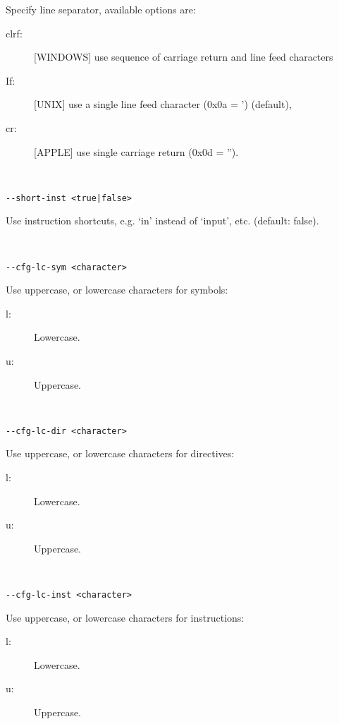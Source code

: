                 Specify line separator, available options are:
                \begin{description}
                  \item [clrf:] [WINDOWS] use sequence of carriage return and line feed characters
                  \item [If:] [UNIX] use a single line feed character (0x0a = ') (default),
                  \item [cr:] [APPLE] use single carriage return (0x0d = '').
                \end{description}
                {
                ~\\
                \usecodefont

                \verb'--short-inst <true|false>'\\
                }
                Use instruction shortcuts, e.g. `in' instead of `input', etc. (default: false).
                {
                ~\\
                \usecodefont

                \verb'--cfg-lc-sym <character>'\\
                }
                Use uppercase, or lowercase characters for symbols:
                \begin{description}
                    \item [l:] Lowercase.
                    \item [u:] Uppercase.
                \end{description}
                {
                ~\\
                \usecodefont

                \verb'--cfg-lc-dir <character>'\\
                }
                Use uppercase, or lowercase characters for directives:
                \begin{description}
                    \item [l:] Lowercase.
                    \item [u:] Uppercase.
                \end{description}
                {
                ~\\
                \usecodefont

                \verb'--cfg-lc-inst <character>'\\
                }
                Use uppercase, or lowercase characters for instructions:
                \begin{description}
                    \item [l:] Lowercase.
                    \item [u:] Uppercase.
                \end{description}
